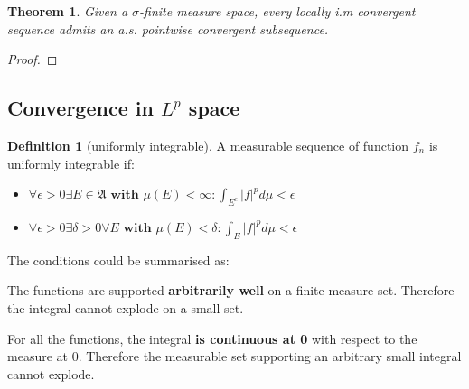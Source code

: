 \documentclass[a4paper,11pt,oneside,fleqn]{book}
\newtheorem{theorem}{Theorem}[section]
\theoremstyle{definition}
\newtheorem{definition}{Definition}[section]
\theoremstyle{remark}
\begin{document}
\begin{theorem}
	Given a $\sigma$-finite measure space, every locally i.m convergent sequence admits an a.s. pointwise convergent subsequence.
\end{theorem}
\begin{proof}	
\end{proof}


\subsection{Convergence in $L^p$ space}
\begin{definition}[uniformly integrable]
A measurable sequence of function $f_n$ is uniformly integrable if:
\begin{itemize}
	\item $\forall \epsilon > 0 \exists E  \in \mathfrak{A} \textbf{ with } \mu(E) < \infty: \int_{E^c} |f|^p d\mu < \epsilon$
	\item $\forall \epsilon > 0 \exists \delta > 0 \forall E \textbf{ with } \mu(E)< \delta: \int_E |f|^p d\mu < \epsilon $ 
\end{itemize}
\end{definition}
The conditions could be summarised as:\par 
The functions are supported \textbf{arbitrarily well} on a finite-measure set. Therefore the integral cannot explode on a small set.\par 
For all the functions, the integral \textbf{is continuous at 0} with respect to the measure at 0. Therefore the measurable set supporting an arbitrary small integral cannot explode.
\end{document}
